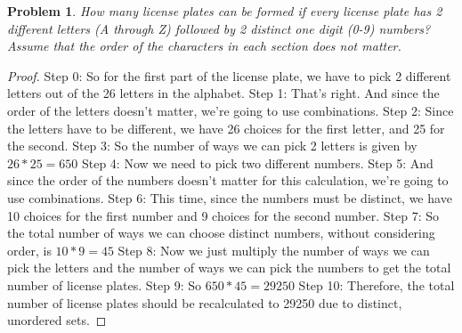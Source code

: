 \documentclass{article}
\newtheorem{theorem}{Problem}
\begin{document}
\begin{theorem}
How many license plates can be formed if every license plate has 2 different letters (A through Z) followed by 2 distinct one digit (0-9) numbers? Assume that the order of the characters in each section does not matter.
\end{theorem}

\begin{proof}
Step 0: So for the first part of the license plate, we have to pick 2 different letters out of the 26 letters in the alphabet.
Step 1: That's right. And since the order of the letters doesn't matter, we're going to use combinations.
Step 2: Since the letters have to be different, we have 26 choices for the first letter, and 25 for the second.
Step 3: So the number of ways we can pick 2 letters is given by $26*25=650$
Step 4: Now we need to pick two different numbers.
Step 5: And since the order of the numbers doesn't matter for this calculation, we're going to use combinations.
Step 6: This time, since the numbers must be distinct, we have 10 choices for the first number and 9 choices for the second number.
Step 7: So the total number of ways we can choose distinct numbers, without considering order, is $10*9=45$
Step 8: Now we just multiply the number of ways we can pick the letters and the number of ways we can pick the numbers to get the total number of license plates.
Step 9: So $650*45=29250$
Step 10: Therefore, the total number of license plates should be recalculated to 29250 due to distinct, unordered sets.
\end{proof}
\end{document}
